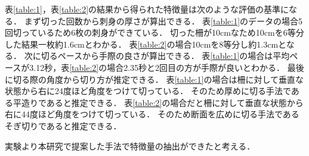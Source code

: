 \begin{table}[ht]
    \centering
    \caption{そぎ切りの特徴量}
    \label{table:2}
\end{table}
表\ref{table:1}，表\ref{table:2}の結果から得られた特徴量は次のような評価の基準になる．
まず切った回数から刺身の厚さが算出できる．
表\ref{table:1}のデータの場合5回切っているため6枚の刺身ができている．
切った柵が10cmなため10cmを6等分した結果一枚約1.6cmとわかる．
表\ref{table:2}の場合10cmを8等分し約1.3cmとなる．
次に切るペースから手際の良さが算出できる．
表\ref{table:1}の場合は平均ペースが3.12秒，表\ref{table:2}の場合2.35秒と2回目の方が手際が良いとわかる．
最後に切る際の角度から切り方が推定できる．
表\ref{table:1}の場合は柵に対して垂直な状態から右に24度ほど角度をつけて切っている．
そのため厚めに切る手法である平造りであると推定できる．
表\ref{table:2}の場合だと柵に対して垂直な状態から右に44度ほど角度をつけて切っている．
そのため断面を広めに切る手法であるそぎ切りであると推定できる．

実験より本研究で提案した手法で特徴量の抽出ができたと考える．

